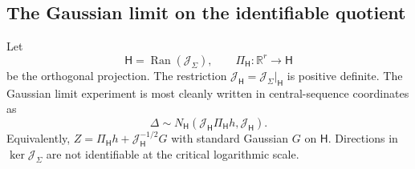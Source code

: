 \subsection{The Gaussian limit on the identifiable quotient}

Let
\begin{equation}\label{eq:v22-identifiable-space}
 \mathsf H=\operatorname{Ran}(\mathcal J_\Sigma),\qquad
 \Pi_{\mathsf H}:\mathbb R^r\to\mathsf H
\end{equation}
be the orthogonal projection.  The restriction
$\mathcal J_{\mathsf H}=\mathcal J_\Sigma|_{\mathsf H}$ is positive definite.
The Gaussian limit experiment is most cleanly written in central-sequence
coordinates as
\begin{equation}\label{eq:v22-gaussian-central-experiment}
          \Delta\sim N_{\mathsf H}(\mathcal J_{\mathsf H}
                   \Pi_{\mathsf H}h,\mathcal J_{\mathsf H}).
\end{equation}
Equivalently,
$Z=\Pi_{\mathsf H}h+\mathcal J_{\mathsf H}^{-1/2}G$ with standard Gaussian
$G$ on $\mathsf H$.  Directions in $\ker\mathcal J_\Sigma$ are not
identifiable at the critical logarithmic scale.

